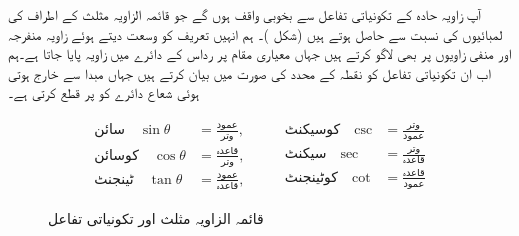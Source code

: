آپ  زاویہ حادہ کے تکونیاتی تفاعل سے بخوبی واقف ہوں گے جو قائمہ الزاویہ مثلث کے اطراف کی لمبائیوں کی نسبت  سے حاصل ہوتے ہیں (شکل )۔ ہم انہیں تعریف کو وسعت دیتے ہوئے  زاویہ منفرجہ اور منفی زاویوں پر بھی لاگو کرتے ہیں جہاں معیاری مقام پر رداس  کے دائرے میں زاویہ پایا جاتا ہے۔ہم اب ان تکونیاتی تفاعل کو نقطہ  کے محدد کی صورت میں بیان کرتے ہیں جہاں مبدا سے خارج ہوتی ہوئی شعاع دائرے کو  پر قطع کرتی  ہے۔
\begin{figure}
\centering
\begin{minipage}[b][][b]{0.3\textwidth}
\centering
{}
\end{minipage}\hfill
\begin{minipage}[b][][b]{0.66\textwidth}
\begin{gather*}
\begin{aligned}
\text{سائن}\quad \sin \theta&=\tfrac{\text{عمود}}{\text{وتر}},\\
\text{کوسائن}\quad\cos \theta&=\tfrac{\text{قاعدہ}}{\text{وتر}},\\
\text{ٹینجنٹ}\quad \tan \theta&=\tfrac{\text{عمود}}{\text{قاعدہ}},
\end{aligned}\quad\quad
\begin{aligned}
\text{کوسیکنٹ}\quad\csc&=\tfrac{\text{وتر}}{\text{عمود}}\\
\text{سیکنٹ}\quad\sec&=\tfrac{\text{وتر}}{\text{قاعدہ}}\\
\text{کوٹینجنٹ}\quad\cot&=\tfrac{\text{قاعدہ}}{\text{عمود}}
\end{aligned}
\end{gather*}
\end{minipage}%
\caption{قائمہ الزاویہ مثلث اور تکونیاتی تفاعل}
\label{شکل_ابتدا_قائمہ_مثلث}
\end{figure}


